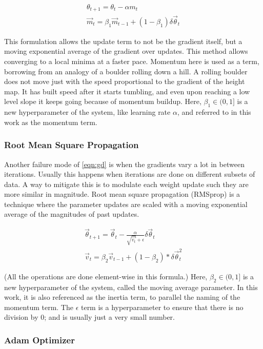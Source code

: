\documentclass[../dissertation.tex]{subfiles}
\begin{document}
\begin{align}
    \theta_{t+1} = \theta_{t} - \alpha m_{t} \\
    \vec{m}_{t} = \beta_1 \vec{m}_{t-1} + (1 - \beta_1) \delta \vec{\theta}_t
\end{align}

This formulation allows the update term to not be the gradient itself, but a moving exponential average of the gradient over updates.
This method allows converging to a local minima at a faster pace.
Momentum here is used as a term, borrowing from an analogy of a boulder rolling down a hill.
A rolling boulder does not move just with the speed proportional to the gradient of the height map.
It has built speed after it starts tumbling, and even upon reaching a low level slope it keeps going because of momentum buildup.
Here, $\beta_1 \in (0,1]$ is a new hyperparameter of the system, like learning rate $\alpha$, and referred to in this work as the momentum term.

\subsubsection{Root Mean Square Propagation}

Another failure mode of \cref{eqn:gd} is when the gradients vary a lot in between iterations.
Usually this happens when iterations are done on different subsets of data.
A way to mitigate this is to modulate each weight update such they are more similar in magnitude.
Root mean square propagation (RMSprop) is a technique where the parameter updates are scaled with a moving exponential average of the magnitudes of past updates.

\begin{align}
    \vec{\theta}_{t+1} = \vec{\theta}_{t} - \frac{\alpha}{\sqrt{\vec{v_t}} + \epsilon} \delta \vec{\theta}_t \\
    \vec{v}_t = \beta_2 \vec{v}_{t-1} + (1 - \beta_2) * \delta \vec{\theta}_t^2
\end{align}

(All the operations are done element-wise in this formula.)
Here, $\beta_2 \in (0,1]$ is a new hyperparameter of the system, called the moving average parameter.
In this work, it is also referenced as the inertia term, to parallel the naming of the momentum term.
The $\epsilon$ term is a hyperparameter to ensure that there is no division by 0; and is usually just a very small number.

\subsubsection{Adam Optimizer}
\end{document}
